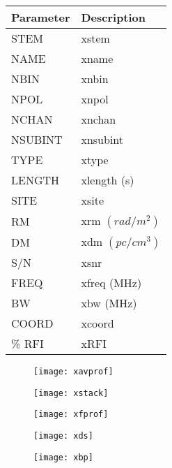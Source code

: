 \documentclass{article}
\begin{document}
\newpage
{}
\begin{figure}[!htbp]
\begin{minipage}[c][0.45\textheight][c]{0.5\linewidth}
    \begin{tabular}{ >{\centering\arraybackslash}m{0.8in} | >{\centering\arraybackslash}m{2.5in} } %
    \textbf{Parameter} & \textbf{Description} \\ \hline 
    STEM & xstem \\ 
    NAME &  xname  \\ 
    NBIN &  xnbin  \\ 
    NPOL &  xnpol\\ 
    NCHAN &  xnchan  \\ 
    NSUBINT &  xnsubint \\ 
    TYPE &  xtype \\ 
    LENGTH &  xlength (s) \\ 
    SITE &  xsite \\ 
    RM &  xrm $(rad/m^2)$ \\ 
    DM &  xdm  $(pc/cm^3)$  \\ 
    S/N &  xsnr \\ 
    FREQ &  xfreq (MHz)  \\
    BW &  xbw (MHz)  \\ 
    COORD &   xcoord \\ 
    \% RFI & xRFI \\ 
   \end{tabular}
   \label{table:student}
\end{minipage}
\hspace{0.02\textwidth}
\begin{subfigure}[c]{0.58\textwidth}
\texttt{[image: xavprof]}
\end{subfigure}
\begin{subfigure}[c]{0.58\textwidth}
\texttt{[image: xstack]}
\end{subfigure}
\hspace{0.02\textwidth}
\begin{subfigure}[c]{0.58\textwidth}
\texttt{[image: xfprof]}
\end{subfigure}
\begin{subfigure}[c]{0.58\textwidth}
\texttt{[image: xds]}
\end{subfigure}
\hspace{0.02\textwidth}
\begin{subfigure}[c]{0.58\textwidth}
\texttt{[image: xbp]}
\end{subfigure}
\end{figure}
\end{document}
